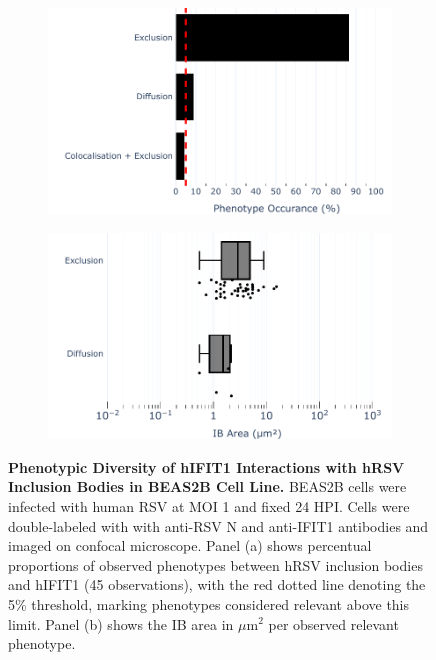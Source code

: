 \begin{figure}
    \begin{subfigure}{0.495\textwidth}
        \caption{}
        \includegraphics[width=1\linewidth]{08. Chapter 3/Figs/02. Infection/01. IFIT1/04. bar_i1_beas2b.pdf} 
    \end{subfigure}
    \begin{subfigure}{0.495\textwidth}
        \caption{}
        \includegraphics[width=1\linewidth]{08. Chapter 3/Figs/02. Infection/01. IFIT1/05. box_i1_beas2b.pdf}
    \end{subfigure}
    \caption[Phenotypic Diversity of hIFIT1 Interactions with hRSV Inclusion Bodies in BEAS2B Cell Line.]{\textbf{Phenotypic Diversity of hIFIT1 Interactions with hRSV Inclusion Bodies in BEAS2B Cell Line.} BEAS2B cells were infected with human RSV at MOI 1 and fixed 24 HPI. Cells were double-labeled with with anti-RSV N and anti-IFIT1 antibodies and imaged on confocal microscope. Panel (a) shows percentual proportions of observed phenotypes between hRSV inclusion bodies and hIFIT1 (45 observations), with the red dotted line denoting the 5\% threshold, marking phenotypes considered relevant above this limit. Panel (b) shows the IB area in \(\mu \mbox{m}^2\) per observed relevant phenotype.}
    \label{fig:Phenotypic Diversity of hIFIT1 Interactions with hRSV Inclusion Bodies in BEAS2B Cell Line}
\end{figure}

